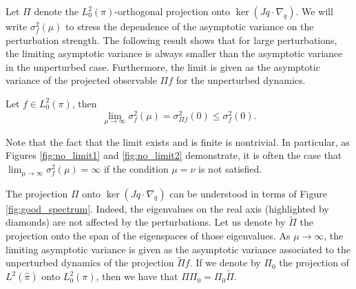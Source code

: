 Let $\Pi$ denote the $L_{0}^{2}(\pi)$-orthogonal projection onto
$\ker (Jq\cdot \nabla_q)$. We will write $\sigma_{f}^{2}(\mu)$ to
stress the dependence of the asymptotic variance on the perturbation
strength. The following result shows that for large perturbations,
the limiting asymptotic variance is always smaller than the asymptotic
variance in the unperturbed case. Furthermore, the limit is given as
the asymptotic variance of the projected observable $\Pi f$ for the
unperturbed dynamics.
\begin{theorem}
	\label{prop:large pert}
	Let $f\in L_{0}^{2}(\pi)$, then
	\[
	\lim_{\mu\rightarrow\infty}\sigma_{f}^{2}(\mu)=\sigma_{\Pi f}^{2}(0)\le\sigma_{f}^{2}(0).
	\]
\end{theorem}
\begin{remark}
	Note that the fact that the limit exists and is finite is nontrivial.
	In particular, as Figures \ref{fig:no_limit1} and \ref{fig:no_limit2} demonstrate, it is often
	the case that $\lim_{\mu\rightarrow\infty}\sigma_{f}^{2}(\mu)=\infty$
	if the condition $\mu=\nu$ is not satisfied.
\end{remark}
\begin{remark}
	\label{rem:projection}
	The projection $\Pi$ onto $\ker(Jq\cdot\nabla_q)$ can be understood in terms of Figure \ref{fig:good_spectrum}. Indeed, the eigenvalues on the real axis (highlighted by diamonds) are not affected by the perturbations. Let us denote by $\tilde{\Pi}$ the projection onto the span of the eigenspaces of those eigenvalues. As $\mu \rightarrow \infty$, the limiting asymptotic  variance is given as the asymptotic variance associated to the unperturbed dynamics of the projection $\tilde{\Pi}f$. If we denote by $\Pi_0$ the projection of $L^2(\widehat{\pi})$ onto $L^2_0(\pi)$, then we have that $\Pi\Pi_0=\Pi_0\tilde{\Pi}$. 
\end{remark}
